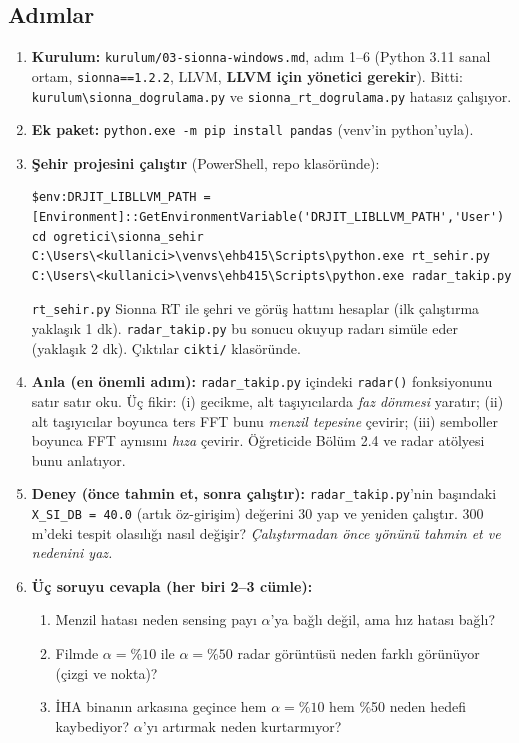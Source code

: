 \documentclass[10.5pt,a4paper]{article}
\begin{document}
\subsection*{Adımlar}
\begin{enumerate}[leftmargin=1.6em]
\item \textbf{Kurulum:} \texttt{kurulum/03-sionna-windows.md}, adım 1--6 (Python 3.11 sanal ortam, \texttt{sionna==1.2.2}, LLVM, \textbf{LLVM için yönetici gerekir}). Bitti: \texttt{kurulum\textbackslash sionna\_dogrulama.py} ve \texttt{sionna\_rt\_dogrulama.py} hatasız çalışıyor.
\item \textbf{Ek paket:} \texttt{python.exe -m pip install pandas} (venv'in python'uyla).
\item \textbf{Şehir projesini çalıştır} (PowerShell, repo klasöründe):
\begin{lstlisting}
$env:DRJIT_LIBLLVM_PATH = [Environment]::GetEnvironmentVariable('DRJIT_LIBLLVM_PATH','User')
cd ogretici\sionna_sehir
C:\Users\<kullanici>\venvs\ehb415\Scripts\python.exe rt_sehir.py
C:\Users\<kullanici>\venvs\ehb415\Scripts\python.exe radar_takip.py
\end{lstlisting}
  \texttt{rt\_sehir.py} Sionna RT ile şehri ve görüş hattını hesaplar (ilk çalıştırma yaklaşık 1 dk). \texttt{radar\_takip.py} bu sonucu okuyup radarı simüle eder (yaklaşık 2 dk). Çıktılar \texttt{cikti/} klasöründe.
\item \textbf{Anla (en önemli adım):} \texttt{radar\_takip.py} içindeki \texttt{radar()} fonksiyonunu satır satır oku. Üç fikir: (i) gecikme, alt taşıyıcılarda \emph{faz dönmesi} yaratır; (ii) alt taşıyıcılar boyunca ters FFT bunu \emph{menzil tepesine} çevirir; (iii) semboller boyunca FFT aynısını \emph{hıza} çevirir. Öğreticide Bölüm 2.4 ve radar atölyesi bunu anlatıyor.
\item \textbf{Deney (önce tahmin et, sonra çalıştır):} \texttt{radar\_takip.py}'nin başındaki \texttt{X\_SI\_DB = 40.0} (artık öz-girişim) değerini 30 yap ve yeniden çalıştır. 300\,m'deki tespit olasılığı nasıl değişir? \emph{Çalıştırmadan önce yönünü tahmin et ve nedenini yaz.}
\item \textbf{Üç soruyu cevapla (her biri 2--3 cümle):}
  \begin{enumerate}[label=(\alph*)]
  \item Menzil hatası neden sensing payı $\alpha$'ya bağlı değil, ama hız hatası bağlı?
  \item Filmde $\alpha=\%10$ ile $\alpha=\%50$ radar görüntüsü neden farklı görünüyor (çizgi ve nokta)?
  \item İHA binanın arkasına geçince hem $\alpha=\%10$ hem \%50 neden hedefi kaybediyor? $\alpha$'yı artırmak neden kurtarmıyor?
  \end{enumerate}
\end{enumerate}
\end{document}
